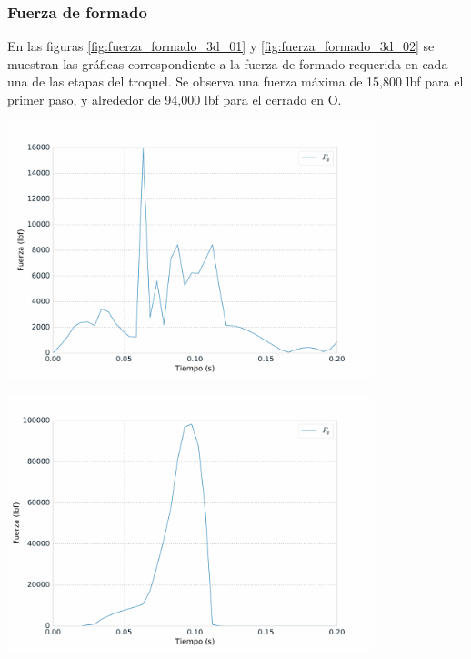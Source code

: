 

\subsubsection{Fuerza de formado}

En las figuras \ref{fig:fuerza_formado_3d_01} y \ref{fig:fuerza_formado_3d_02} se muestran las gráficas 
correspondiente a la fuerza de formado requerida en cada una de las etapas del troquel. Se observa una 
fuerza máxima de 15,800 lbf para el primer paso, y alrededor de 94,000 lbf para el cerrado en O.\\

\begin{center}
\includegraphics[width=0.8\textwidth]{src/ch4/fuerza_formado_3d_01.pdf}
\label{fig:fuerza_formado_3d_01}
\end{center}

\begin{center}
\includegraphics[width=0.8\textwidth]{src/ch4/fuerza_formado_3d_02.pdf}
\label{fig:fuerza_formado_3d_02}
\end{center}

